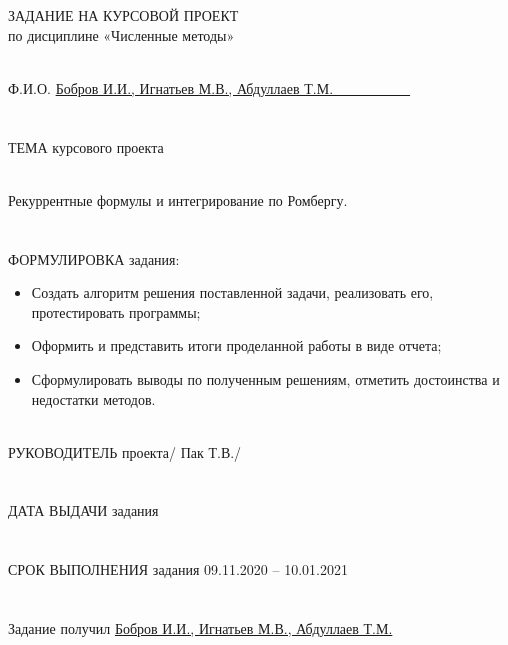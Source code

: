 \documentclass[14pt, titlepage, a4paper]{extarticle} %
\begin{document}
	
	
	\begin{center}
		ЗАДАНИЕ НА КУРСОВОЙ ПРОЕКТ\\
		по дисциплине «Численные методы»
	\end{center}
	
	~\\	
	Ф.И.О. \uline{\vspace{10pt} Бобров И.И., Игнатьев М.В., Абдуллаев Т.М.~~~~~~~~~~~}\\
	~\\
	~\\
	ТЕМА курсового проекта
	
	~\\
	Рекуррентные формулы и интегрирование по Ромбергу.
	\\
	~\\
	~\\
	ФОРМУЛИРОВКА  задания:
	
	\begin{itemize}
		\item Создать алгоритм решения поставленной задачи, реализовать его, протестировать программы;
		\item Оформить и представить итоги проделанной работы в виде отчета;
		\item Сформулировать выводы по полученным решениям, отметить достоинства и недостатки методов.
	\end{itemize}

	~\\
	РУКОВОДИТЕЛЬ проекта\uline{\hspace{80pt}}/ Пак Т.В./\\	
	\\
	~\\
	ДАТА ВЫДАЧИ задания\uline{\hspace{80pt}}\\
	\\
	~\\
	СРОК ВЫПОЛНЕНИЯ задания 09.11.2020 – 10.01.2021\\
	\\
	~\\
	Задание получил \uline{Бобров И.И., Игнатьев М.В., Абдуллаев Т.М.}\\
	
	\thispagestyle{empty}
	\newpage
	
	
\end{document}
